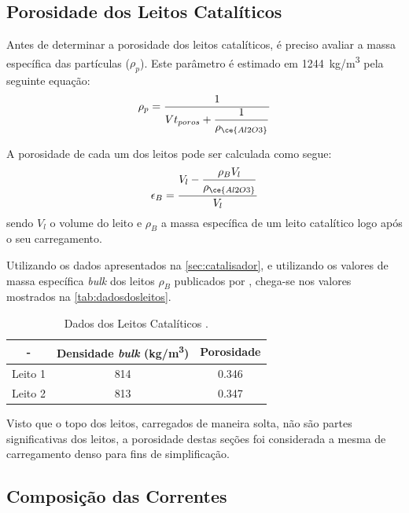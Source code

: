 \subsection{Porosidade dos Leitos Catalíticos}
\label{sec:propriedadesleitoscataliticos}

Antes de determinar a porosidade dos leitos catalíticos, é preciso avaliar a
massa específica das partículas ($\rho_{p}$). Este parâmetro é estimado em
\SI{1244}{kg/m^3} pela seguinte equação:
\begin{equation}
\rho_{p} = \dfrac{1}{Vt_{poros}+\dfrac{1}{\rho_{\ce{Al2O3}}}}
\label{eq:rhoparticula}
\end{equation}


A porosidade de cada um dos leitos pode ser calculada como segue:
\begin{equation}
\epsilon_{B} = \dfrac{V_{l}-\dfrac{\rho_{B}V_l}{\rho_{\ce{Al2O3}}}}{V_l}
\label{eq:porosidade}
\end{equation}
sendo $V_l$ o volume do leito e $\rho_B$ a massa específica de um leito
catalítico logo após o seu carregamento.

Utilizando os dados apresentados na \autoref{sec:catalisador}, e utilizando os
valores de massa específica \emph{bulk} dos leitos $\rho_{B}$ publicados por
, chega-se nos valores mostrados na
\autoref{tab:dadosdosleitos}.

\begin{table}[!htb]
\begin{center}
\caption{Dados dos Leitos Catalíticos \cite{Rojas2014a}.}
\label{tab:dadosdosleitos}
\small
\begin{tabular}{ccc}
{ - } & {Densidade \emph{bulk} (\si{kg/m^3})} & {Porosidade} 
\\
\hline
{Leito 1} & \num{814} & \num{0,346} \\
{Leito 2} & \num{813} & \num{0,347} \\
\bottomrule
\end{tabular}
\end{center}
\end{table}

Visto que o topo dos leitos, carregados de maneira solta, não são partes
significativas dos leitos, a porosidade destas seções foi
considerada a mesma de carregamento denso para fins de simplificação. 

\subsection{Composição das Correntes} \label{sec:composicaocorrentes}

